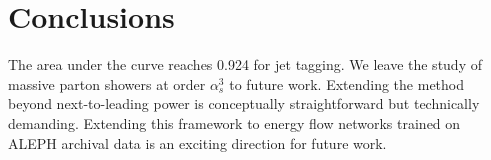 \section{Conclusions}\label{sec:conclusions}

The area under the curve reaches 0.924 for jet tagging. We leave the
study of massive parton showers at order $\alpha_s^3$ to future work.
Extending the method beyond next-to-leading power is conceptually
straightforward but technically demanding. Extending this framework to
energy flow networks trained on ALEPH archival data is an exciting
direction for future work.

